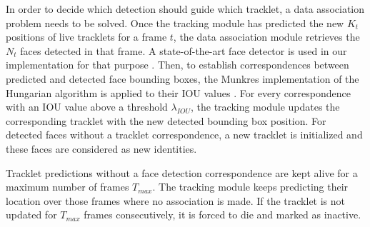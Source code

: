 In order to decide which detection should guide which tracklet, a data association problem needs to be solved. 
Once the tracking module has predicted the new $K_t$ positions of live tracklets for a frame $t$, the data association module retrieves the $N_t$ faces detected in that frame. A state-of-the-art face detector is used in our implementation for that purpose \cite{zhang2017faceboxes}. Then, to establish correspondences between predicted and detected face bounding boxes, the Munkres implementation of the Hungarian algorithm is applied to their IOU values \cite{kuhn1955hungarian}. For every correspondence with an IOU value above a threshold $\lambda_{IOU}$, the tracking module updates the corresponding tracklet with the new detected bounding box position. For detected faces without a tracklet correspondence, a new tracklet is initialized and these faces are considered as new identities.

Tracklet predictions without a face detection correspondence are kept alive for a maximum number of frames $T_{max}$. The tracking module keeps predicting their location over those frames where no association is made. If the tracklet is not updated for $T_{max}$ frames consecutively, it is forced to die and marked as inactive.

    
    
    


